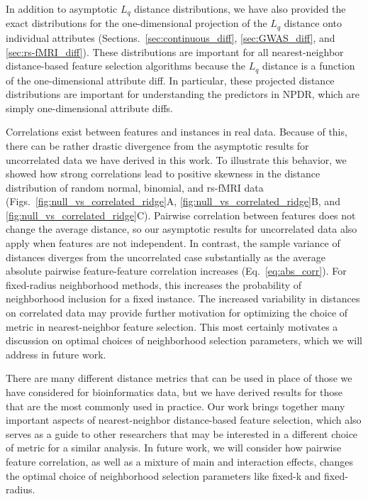 \documentclass[aoas]{imsart}
\begin{document}
In addition to asymptotic $L_q$ distance distributions, we have also provided the exact distributions for the one-dimensional projection of the $L_q$ distance onto individual attributes (Sections.~\ref{sec:continuous_diff}, \ref{sec:GWAS_diff}, and \ref{sec:rs-fMRI_diff}). These distributions are important for all nearest-neighbor distance-based feature selection algorithms because the $L_q$ distance is a function of the one-dimensional attribute diff. In particular, these projected distance distributions are important for understanding the predictors in NPDR, which are simply one-dimensional attribute diffs.

Correlations exist between features and instances in real data. Because of this, there can be rather drastic divergence from the asymptotic results for uncorrelated data we have derived in this work. To illustrate this behavior, we showed how strong correlations lead to positive skewness in the distance distribution of random normal, binomial, and rs-fMRI data (Figs.~\ref{fig:null_vs_correlated_ridge}A, \ref{fig:null_vs_correlated_ridge}B, and \ref{fig:null_vs_correlated_ridge}C). Pairwise correlation between features does not change the average distance, so our asymptotic results for uncorrelated data also apply when features are not independent. In contrast, the sample variance of distances diverges from the uncorrelated case substantially as the average absolute pairwise feature-feature correlation increases (Eq.~\ref{eq:abs_corr}). For fixed-radius neighborhood methods, this increases the probability of neighborhood inclusion for a fixed instance. The increased variability in distances on correlated data may provide further motivation for optimizing the choice of metric in nearest-neighbor feature selection. This most certainly motivates a discussion on optimal choices of neighborhood selection parameters, which we will address in future work.

There are many different distance metrics that can be used in place of those we have considered for bioinformatics data, but we have derived results for those that are the most commonly used in practice. Our work brings together many important aspects of nearest-neighbor distance-based feature selection, which also serves as a guide to other researchers that may be interested in a different choice of metric for a similar analysis. In future work, we will consider how pairwise feature correlation, as well as a mixture of main and interaction effects, changes the optimal choice of neighborhood selection parameters like fixed-k and fixed-radius.
\end{document}
